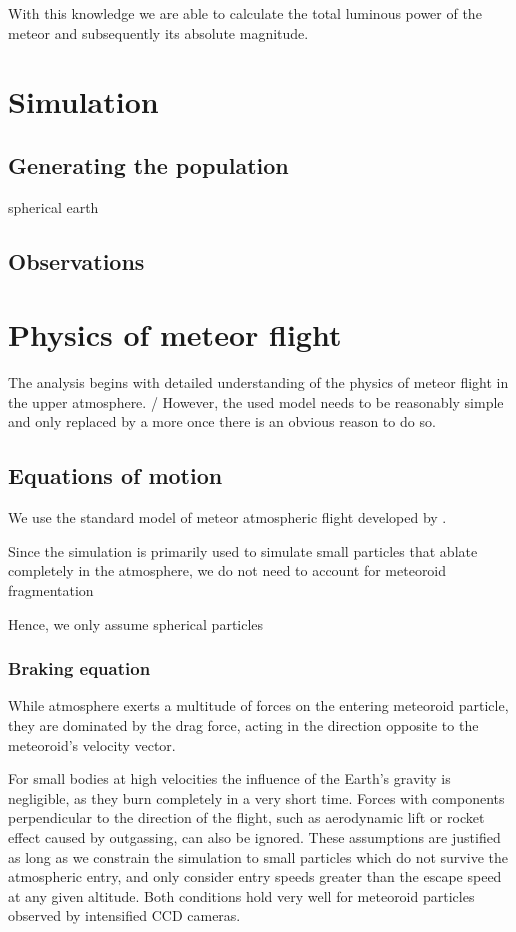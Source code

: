     With this knowledge we are able to calculate the total luminous power of the meteor and subsequently its absolute magnitude.

\section{Simulation}
    
    \subsection{Generating the population}
    spherical earth
    
    \subsection{Observations}
    

\section{Physics of meteor flight} \label{sim:pmf}
    The analysis begins with detailed understanding of the physics of meteor flight in the upper atmosphere.
    /
    However, the used model needs to be reasonably simple and only replaced by a more 
    once there is an obvious reason to do so.
    
    \subsection{Equations of motion}            
        We use the standard model of meteor atmospheric flight developed by \cite{opik1958}.
        
        Since the simulation is primarily used to simulate small particles that ablate completely in the atmosphere,
        we do not need to account for meteoroid fragmentation 
        
        Hence, we only assume spherical particles
    
        \subsubsection{Braking equation} \label{sim:pmf:em:be}
            While atmosphere exerts a multitude of forces on the entering meteoroid particle,
            they are dominated by the drag force, acting in the direction opposite to the meteoroid's velocity vector.

            For small bodies at high velocities the influence of the Earth's gravity is negligible, 
            as they burn completely in a very short time. Forces with components perpendicular
            to the direction of the flight, such as aerodynamic lift or rocket effect caused by outgassing,
            can also be ignored. These assumptions are justified as long as we constrain the simulation to small particles which
            do not survive the atmospheric entry, and only consider entry speeds greater than the
            escape speed at any given altitude. Both conditions hold very well for meteoroid particles observed by
            intensified CCD cameras.


